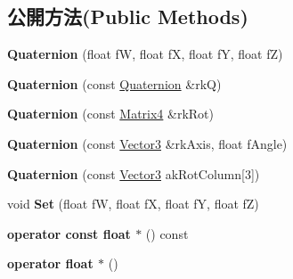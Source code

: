 \subsection*{公開方法(Public Methods)}
\begin{DoxyCompactItemize}
\item 
{\bfseries Quaternion} (float fW, float fX, float fY, float fZ)\hypertarget{class_magnum_1_1_quaternion_a50243fc38f9fadc1193ea9a282961697}{}\label{class_magnum_1_1_quaternion_a50243fc38f9fadc1193ea9a282961697}

\item 
{\bfseries Quaternion} (const \hyperlink{class_magnum_1_1_quaternion}{Quaternion} \&rkQ)\hypertarget{class_magnum_1_1_quaternion_a350ae49ebcaea47c06589bc1fbf47cbd}{}\label{class_magnum_1_1_quaternion_a350ae49ebcaea47c06589bc1fbf47cbd}

\item 
{\bfseries Quaternion} (const \hyperlink{class_magnum_1_1_matrix4}{Matrix4} \&rk\+Rot)\hypertarget{class_magnum_1_1_quaternion_abbd53189e0b59bbef8efefda40a6c3c6}{}\label{class_magnum_1_1_quaternion_abbd53189e0b59bbef8efefda40a6c3c6}

\item 
{\bfseries Quaternion} (const \hyperlink{class_magnum_1_1_vector3}{Vector3} \&rk\+Axis, float f\+Angle)\hypertarget{class_magnum_1_1_quaternion_a4cf6e61e872a0e0e2c2dce7e81a70d8f}{}\label{class_magnum_1_1_quaternion_a4cf6e61e872a0e0e2c2dce7e81a70d8f}

\item 
{\bfseries Quaternion} (const \hyperlink{class_magnum_1_1_vector3}{Vector3} ak\+Rot\+Column\mbox{[}3\mbox{]})\hypertarget{class_magnum_1_1_quaternion_aea3e5fa81e97a7fdf1fff66e8994fca7}{}\label{class_magnum_1_1_quaternion_aea3e5fa81e97a7fdf1fff66e8994fca7}

\item 
void {\bfseries Set} (float fW, float fX, float fY, float fZ)\hypertarget{class_magnum_1_1_quaternion_a418489a80d2426dca9709f3a9eba2ece}{}\label{class_magnum_1_1_quaternion_a418489a80d2426dca9709f3a9eba2ece}

\item 
{\bfseries operator const float $\ast$} () const \hypertarget{class_magnum_1_1_quaternion_a28395e00cb9224bf87ab6fdd212bdb93}{}\label{class_magnum_1_1_quaternion_a28395e00cb9224bf87ab6fdd212bdb93}

\item 
{\bfseries operator float $\ast$} ()\hypertarget{class_magnum_1_1_quaternion_ae706dd0548e12e1744a106c601183598}{}\label{class_magnum_1_1_quaternion_ae706dd0548e12e1744a106c601183598}


\end{DoxyCompactItemize}
